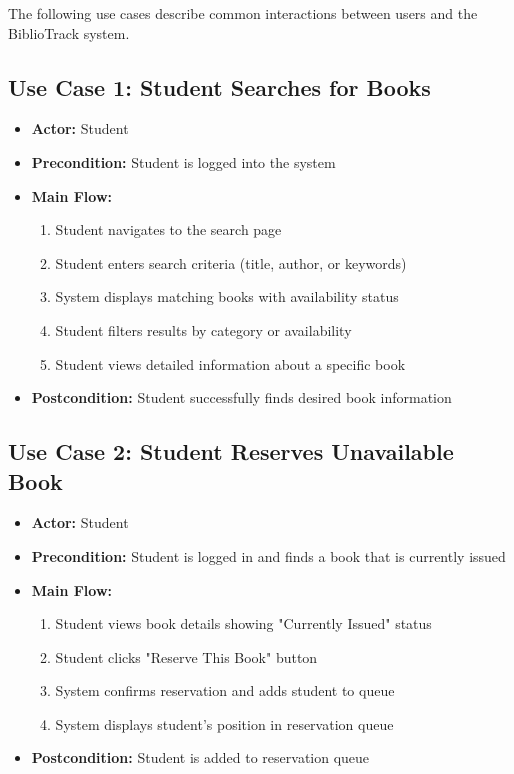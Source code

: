 \documentclass[12pt,a4paper]{report}
\begin{document}
The following use cases describe common interactions between users and the BiblioTrack system.

\subsection{Use Case 1: Student Searches for Books}

\begin{itemize}
    \item \textbf{Actor:} Student
    \item \textbf{Precondition:} Student is logged into the system
    \item \textbf{Main Flow:}
    \begin{enumerate}
        \item Student navigates to the search page
        \item Student enters search criteria (title, author, or keywords)
        \item System displays matching books with availability status
        \item Student filters results by category or availability
        \item Student views detailed information about a specific book
    \end{enumerate}
    \item \textbf{Postcondition:} Student successfully finds desired book information
\end{itemize}

\subsection{Use Case 2: Student Reserves Unavailable Book}

\begin{itemize}
    \item \textbf{Actor:} Student
    \item \textbf{Precondition:} Student is logged in and finds a book that is currently issued
    \item \textbf{Main Flow:}
    \begin{enumerate}
        \item Student views book details showing "Currently Issued" status
        \item Student clicks "Reserve This Book" button
        \item System confirms reservation and adds student to queue
        \item System displays student's position in reservation queue
    \end{enumerate}
    \item \textbf{Postcondition:} Student is added to reservation queue
\end{itemize}
\end{document}
